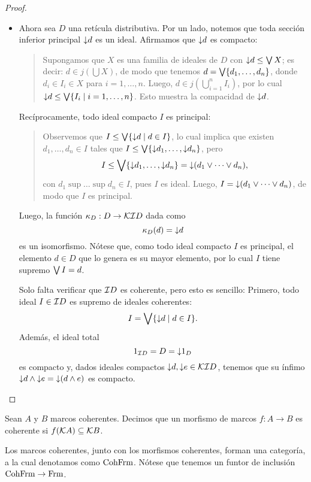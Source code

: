 \begin{proof}
\begin{itemize}
        \item
        Ahora sea $D$ una retícula distributiva.
        Por un lado, notemos que toda sección inferior
        principal $\down d$ es un ideal.
        Afirmamos que $\down d$ es compacto:
        \begin{quote}
            Supongamos que $X$ es una familia de ideales de $D$
            con $\down d\leq \Sup X$; es decir: $d\in j(\bigcup X)$,
            de modo que tenemos $d=\Sup\{d_1,\dots,d_n\}$,
            donde $d_i\in I_i\in X$ para $i=1,\dots,n$.
            Luego, $d\in j(\bigcup_{i=1}^n I_i)$,
            por lo cual $\down d\leq\Sup\{I_i\mid i=1,\dots,n\}$.
            Esto muestra la compacidad de $\down d$.
        \end{quote}
        Recíprocamente, todo ideal compacto $I$ es principal:
        \begin{quote}
            Observemos que $I\leq\Sup\{\down d\mid d\in I\}$,
            lo cual implica que existen $d_1,\dots,d_n\in I$
            tales que $I\leq\Sup\{\down d_1,\dots,\down d_n\}$,
            pero
            \[
                I
                \leq \Sup\{\down d_1,\dots,\down d_n\}
                = \down(d_1\sup\cdots\sup d_n),
            \]
            con $d_1\sup\dots\sup d_n\in I$, pues $I$ es ideal.
            Luego, $I=\down(d_1\sup\cdots\sup d_n)$,
            de modo que $I$ es principal.
       \end{quote} 
        Luego, la función $\kappa_D:D\to\cal K\cal ID$ dada como
        \[
            \kappa_D(d) = \down d
        \]
        es un isomorfismo.
        Nótese que, como todo ideal compacto $I$ es principal,
        el elemento $d\in D$ que lo genera es su mayor elemento,
        por lo cual $I$ tiene supremo $\Sup I=d$.
        
        Solo falta verificar que $\cal ID$ es coherente,
        pero esto es sencillo:
        Primero, todo ideal $I\in\cal ID$ es supremo
        de ideales coherentes:
        \[
            I = \Sup\{\down d\mid d\in I\}.
        \]
        Además, el ideal total
        \[
            1_{\cal ID}=D=\down 1_D
        \]
        es compacto y, dados ideales compactos
        $\down d,\down e\in\cal K\cal ID$, tenemos que su ínfimo
        $\down d\inf\down e=\down(d\inf e)$ es compacto.
    \end{itemize}
\end{proof}

\begin{defn}
    Sean $A$ y $B$ marcos coherentes.
    Decimos que un morfismo de marcos $f:A\to B$ es coherente
    si $f(\cal KA)\subseteq\cal KB$.
    
    Los marcos coherentes, junto con los morfismos coherentes,
    forman una categoría, a la cual denotamos como $\CohFrm$.
    Nótese que tenemos un funtor de inclusión $\CohFrm\to\Frm$.
\end{defn}

